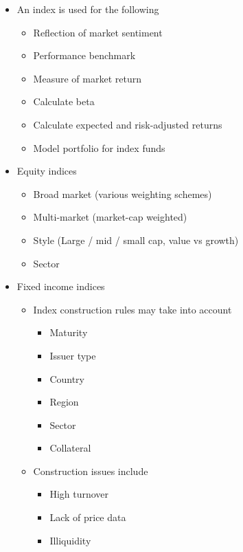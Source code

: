 \documentclass[../notes_compiled.tex]{subfiles}
\begin{document}
\begin{itemize}
\item An index is used for the following

\begin{itemize}
\item Reflection of market sentiment
\item Performance benchmark
\item Measure of market return
\item Calculate beta
\item Calculate expected and risk-adjusted returns
\item Model portfolio for index funds
\end{itemize}

\item Equity indices
\begin{itemize}
\item Broad market (various weighting schemes)
\item Multi-market (market-cap weighted)
\item Style (Large / mid / small cap, value vs growth)
\item Sector
\end{itemize}

\item Fixed income indices
\begin{itemize}
\item Index construction rules may take into account
\begin{multicols}{3}
\begin{itemize}
\item Maturity
\item Issuer type
\item Country
\item Region
\item Sector
\item Collateral
\end{itemize}
\end{multicols}
\item Construction issues include
\begin{multicols}{3}
\begin{itemize}
\item High turnover
\item Lack of price data
\item Illiquidity
\end{itemize}
\end{multicols}
\end{itemize}


\end{itemize}
\end{document}
